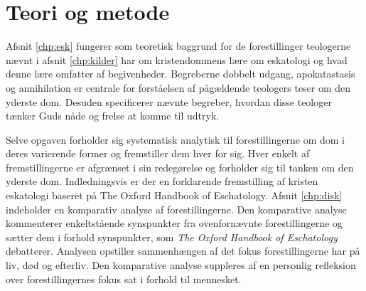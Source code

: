 \chapter{Teori og metode}
Afsnit \ref{chp:esk} fungerer som teoretisk baggrund for de forestillinger teologerne nævnt i afsnit \ref{chp:kilder} har om kristendommens lære om eskatologi og hvad denne lære omfatter af begivenheder. Begreberne dobbelt udgang, apokatastasis og annihilation er centrale for forståelsen af pågældende teologers teser om den yderste dom. Desuden specificerer nævnte begreber, hvordan disse teologer tænker Guds nåde og frelse at komme til udtryk.

Selve opgaven forholder sig systematisk analytisk til forestillingerne om dom i deres varierende former og fremstiller dem hver for sig. Hver enkelt af fremstillingerne er afgrænset i sin redegørelse og forholder sig til tanken om den yderste dom. Indledningsvis er der en forklarende fremstilling af kristen eskatologi baseret på The Oxford Handbook of Eschatology. Afsnit \ref{chp:disk} indeholder en komparativ analyse af forestillingerne. Den komparative analyse kommenterer enkeltstående synspunkter fra ovenfornævnte forestillingerne og sætter dem i forhold synspunkter, som \textit{The Oxford Handbook of Eschatology} debatterer. Analysen opstiller sammenhængen af det fokus forestillingerne har på liv, død og efterliv. Den komparative analyse suppleres af en personlig refleksion over forestillingernes fokus sat i forhold til mennesket.